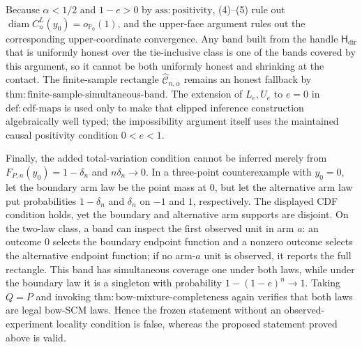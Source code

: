 Because \(\alpha<1/2\) and \(1-e>0\) by \(\mathrm{ass:positivity}\), (4)--(5) rule out \(\operatorname{diam}C_n^L(y_0)=o_{\mathbb P_0}(1)\), and the upper-face argument rules out the corresponding upper-coordinate convergence.  Any band built from the handle \(\mathsf H_{\mathrm{dir}}\) that is uniformly honest over the tie-inclusive class is one of the bands covered by this argument, so it cannot be both uniformly honest and shrinking at the contact.  The finite-sample rectangle \(\widehat{\mathcal C}_{n,\alpha}\) remains an honest fallback by \(\mathrm{thm:finite\text{-}sample\text{-}simultaneous\text{-}band}\).  The extension of \(L_e,U_e\) to \(e=0\) in \(\mathrm{def:cdf\text{-}maps}\) is used only to make that clipped inference construction algebraically well typed; the impossibility argument itself uses the maintained causal positivity condition \(0<e<1\).

Finally, the added total-variation condition cannot be inferred merely from \(F_{P,n}(y_0)=1-\delta_n\) and \(n\delta_n\to0\).  In a three-point counterexample with \(y_0=0\), let the boundary arm law be the point mass at \(0\), but let the alternative arm law put probabilities \(1-\delta_n\) and \(\delta_n\) on \(-1\) and \(1\), respectively.  The displayed CDF condition holds, yet the boundary and alternative arm supports are disjoint.  On the two-law class, a band can inspect the first observed unit in arm \(a\): an outcome \(0\) selects the boundary endpoint function and a nonzero outcome selects the alternative endpoint function; if no arm-\(a\) unit is observed, it reports the full rectangle.  This band has simultaneous coverage one under both laws, while under the boundary law it is a singleton with probability \(1-(1-e)^n\to1\).  Taking \(Q=P\) and invoking \(\mathrm{thm:bow\text{-}mixture\text{-}completeness}\) again verifies that both laws are legal bow-SCM laws.  Hence the frozen statement without an observed-experiment locality condition is false, whereas the proposed statement proved above is valid.